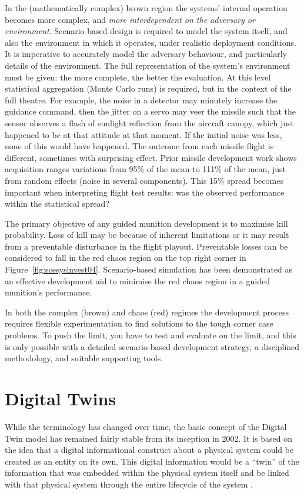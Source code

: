 In the (mathematically complex) brown region the systems' internal operation becomes more complex, and \textit{more interdependent on the adversary or environment}. Scenario-based design is required to model the system itself, and also the environment in which it operates, under realistic deployment conditions.
It is imperative to accurately model the adversary behaviour, and particularly details of the environment. The full representation of the system's environment must be given: the more complete, the better the evaluation.  At this level statistical aggregation (Monte Carlo runs) is required, but in the context of the full theatre. For example, the noise in a detector may minutely increase the guidance command, then the jitter on a servo may veer the missile such that the sensor observes a flash of sunlight reflection from the aircraft canopy, which just happened to be at that attitude at that moment. If the initial noise was less, none of this would have happened.  The outcome from each missile flight is different, sometimes with surprising effect. Prior missile development work shows acquisition ranges variations from  95\% of the mean to 111\% of the mean, just from random effects (noise in several components). This 15\% spread becomes important when interpreting flight test results: was the observed performance within the statistical spread?

The primary objective of any guided munition development is to maximise kill probability.  Loss of kill may be because of inherent limitations or it may result from a preventable disturbance in the flight playout.
Preventable losses can be considered to fall in the red chaos region on the top right corner in Figure~\ref{fig:scesysinvest04}.  Scenario-based simulation has been demonstrated as an effective development aid to minimise the red chaos region in a guided munition's performance.

In both the complex (brown) and chaos (red) regimes the development process requires flexible experimentation to find solutions to the tough corner case problems.  To push the limit, you have to test and evaluate on the limit, and this is only possible with a detailed scenario-based development strategy, a disciplined methodology, and suitable supporting tools.



\section{Digital Twins}
While the terminology has changed over time, the basic concept of the Digital Twin
model has remained fairly stable from its inception in 2002. It is based on the idea
that a digital informational construct about a physical system could be created as an
entity on its own. This digital information would be a ``twin'' of the information that
was embedded within the physical system itself and be linked with that physical
system through the entire lifecycle of the system \cite{Grieves2017}.

